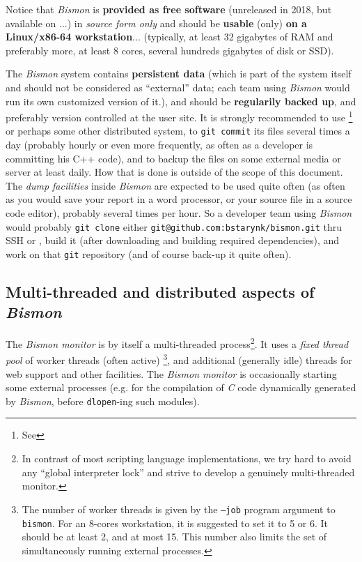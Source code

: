 Notice that \textit{Bismon} is \textbf{provided as free software}
(unreleased in 2018, but available on
 ...) in \emph{source form only} and
should be \textbf{usable} (only) \textbf{on a Linux/x86-64
  workstation}... (typically, at least 32 gigabytes of RAM and
preferably more, at least 8 cores, several hundreds gigabytes of disk
or SSD).

The \textit{Bismon} system contains \textbf{persistent data} (which is
part of the system itself and should not be considered as ``external''
data; each team using \textit{Bismon} would run its own customized
version of it.), and should be \textbf{regularily backed up}, and
preferably version controlled at the user site. It is strongly
recommended to use  \footnote{See
  } or perhaps some other distributed
 system, to \texttt{git
  commit} its files several times a day (probably hourly or even more
frequently, as often as a developer is committing his C++ code), and
to backup the files on some external media or server at least
daily. How that is done is outside of the scope of this document. The
\emph{dump facilities} inside \textit{Bismon} are expected to be used
quite often (as often as you would save your report in a word
processor, or your source file in a source code editor), probably
several times per hour. So a developer team using \textit{Bismon}
would probably \texttt{git clone} either
\texttt{git@github.com:bstarynk/bismon.git} thru SSH or
, build it (after
downloading and building required dependencies), and work on that
\texttt{git} repository (and of course back-up it quite often).


\subsection{Multi-threaded and distributed aspects of \textit{Bismon}}

The \textit{Bismon monitor} is by itself a multi-threaded
process\footnote{In contrast of most scripting language
  implementations, we try hard to avoid any ``global interpreter
  lock'' and strive to develop a genuinely multi-threaded monitor.}.
It uses a \emph{fixed thread pool} of worker threads (often active)
\footnote{The number of worker threads is given by the \texttt{--job}
  program argument to \texttt{bismon}. For an 8-cores workstation, it
  is suggested to set it to 5 or 6. It should be at least 2, and at
  most 15. This number also limits the set of simultaneously running
  external processes.}, and additional (generally idle) threads for
web support and other facilities. The \textit{Bismon monitor} is
occasionally starting some external processes (e.g. for the
compilation of \emph{C} code dynamically generated by \textit{Bismon},
before \texttt{dlopen}-ing such modules).

